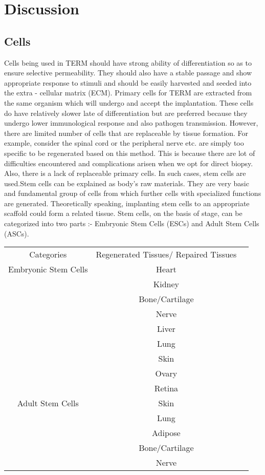 \documentclass[12pt]{article}
\begin{document}
\centering
\section{Discussion}
\raggedright
\bigskip
\bigskip
\subsection{Cells}
\bigskip
\bigskip
Cells being used in TERM should have strong ability of differentiation so as to ensure selective permeability. They should also have a stable passage and show appropriate response to stimuli and should be easily harvested and seeded into the extra - cellular matrix (ECM). Primary cells for TERM are extracted from the same organism which will undergo and accept the implantation. These cells do have relatively slower late of differentiation but are preferred because they undergo lower immunological response and also pathogen transmission. However, there are limited number of cells that are replaceable by tissue formation. For example, consider the spinal cord or the peripheral nerve etc. are simply too specific to be regenerated based on this method. This is because there are lot of difficulties encountered and complications arisen when we opt for direct biopsy. Also, there is a lack of replaceable primary cells. In such cases, stem cells are used.Stem cells can be explained as body's raw materials. They are very basic and fundamental group of cells from which further cells with specialized functions are generated. Theoretically speaking, implanting stem cells to an appropriate scaffold could form a related tissue. Stem cells, on the basis of stage, can be categorized into two parts :- Embryonic Stem Cells (ESCs) and Adult Stem Cells (ASCs).
\linebreak
\linebreak
\begin{tabular}{|c|c|c| }
\hline
Categories & Regenerated Tissues/ Repaired Tissues\\
Embryonic Stem Cells & Heart\\
& Kidney\\
&Bone/Cartilage\\
&Nerve\\
&Liver\\
&Lung\\
&Skin\\
&Ovary\\
&Retina\\
Adult Stem Cells &Skin\\
&Lung\\
&Adipose\\
&Bone/Cartilage\\
&Nerve\\
\hline
\end{tabular}
\end{document}
